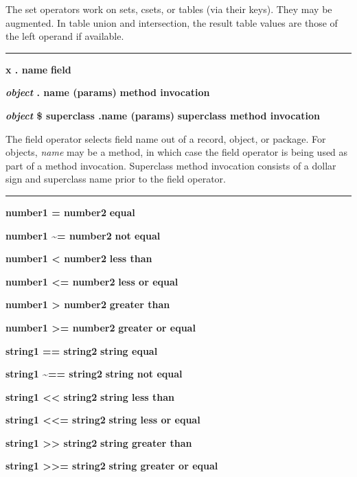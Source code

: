 \noindent
The set operators work on sets, csets, or tables (via their keys).
They may be augmented. In table union and intersection, the result
table values are those of the left operand if available.

\bigskip\hrule\vspace{0.1cm}

\noindent
{\bf x . name } \hfill {\bf field}

\noindent
{\bf \textit{object} . name (params) } \hfill {\bf method invocation}

\noindent
{\bf \textit{object} \$ superclass .name (params) } \hfill {\bf superclass method invocation}

\noindent
The field operator selects field name out of a record,
object, or package. For objects, \textit{name} may be a method, in
which case the field operator is being used as part of a method
invocation. Superclass method invocation consists of a dollar sign and
superclass name prior to the field operator.

\bigskip\hrule\vspace{0.1cm}
\noindent
{\bf number1 = number2 } \hfill {\bf equal}

\noindent
{}
{\bf number1 \~{}= number2 } \hfill {\bf not equal}

\noindent
{\bf number1 {\textless} number2 } \hfill {\bf less than}

\noindent
{\bf number1 {\textless}= number2 } \hfill {\bf less or equal}

\noindent
{\bf number1 {\textgreater} number2 } \hfill {\bf greater than}

\noindent
{\bf number1 {\textgreater}= number2 } \hfill {\bf greater or equal}

\noindent
{\bf string1 == string2 } \hfill {\bf string equal}

\noindent
{\bf string1 \~{}== string2 } \hfill {\bf string not equal}

\noindent
{\bf string1 {\textless}{\textless} string2 } \hfill {\bf string less than}

\noindent
{\bf string1 {\textless}{\textless}= string2 } \hfill {\bf string less or equal}

\noindent
{\bf string1 {\textgreater}{\textgreater} string2 } \hfill {\bf string greater than}

\noindent
{\bf string1 {\textgreater}{\textgreater}= string2 } \hfill {\bf string greater or equal}

